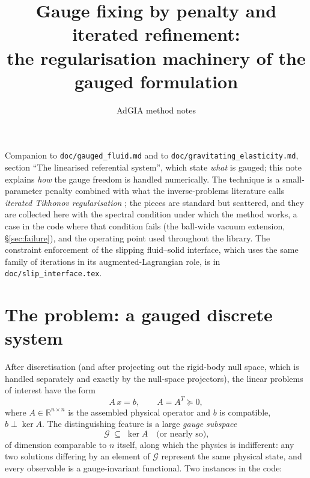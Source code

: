 \documentclass[11pt]{article}
\title{Gauge fixing by penalty and iterated refinement:\\
       the regularisation machinery of the gauged formulation}
\author{AdGIA method notes}
\date{}
\newcommand{\R}{\mathbb{R}}
\begin{document}
\maketitle

\noindent
Companion to \texttt{doc/gauged\_fluid.md} and to
\texttt{doc/gravitating\_elasticity.md}, section ``The linearised
referential system'', which state \emph{what} is gauged; this note
explains \emph{how} the gauge freedom is handled numerically. The
technique is a small-parameter penalty combined with what the
inverse-problems literature calls \emph{iterated Tikhonov
regularisation} \cite{Lardy1975,EnglHankeNeubauer}; the pieces are
standard but scattered, and they are collected here with the spectral
condition under which the method works, a case in the code where that
condition fails (the ball-wide vacuum extension, \S\ref{sec:failure}),
and the operating point used throughout the library. The constraint
enforcement of the slipping fluid--solid interface, which uses the same
family of iterations in its augmented-Lagrangian role, is in
\texttt{doc/slip\_interface.tex}.

\section{The problem: a gauged discrete system}

After discretisation (and after projecting out the rigid-body null
space, which is handled separately and exactly by the null-space
projectors), the linear problems of interest have the form
\begin{equation}
  A\,x = b, \qquad A = A^{T} \succeq 0,
  \label{eq:system}
\end{equation}
where $A \in \R^{n\times n}$ is the assembled physical operator and $b$
is compatible, $b \perp \ker A$. The distinguishing feature is a large
\emph{gauge subspace}
\[
  \mathcal{G} \;\subseteq\; \ker A
  \quad\text{(or nearly so),}
\]
of dimension comparable to $n$ itself, along which the physics is
indifferent: any two solutions differing by an element of $\mathcal{G}$
represent the same physical state, and every observable is a
gauge-invariant functional. Two instances in the code:
\end{document}
